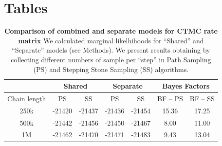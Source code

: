 \documentclass[10pt]{article}
\begin{document}
\section*{Tables}
\begin{table}[!ht]
\caption{{\bf Comparison of combined and separate models for CTMC rate matrix} We calculated marginal likelhihoods for ``Shared'' and ``Separate'' models (see Methods). We present results obtaining by collecting different numbers of sample per ``step'' in Path Sampling (PS) and Stepping Stone Sampling (SS) algorithms.}
 \begin{center}
 \begin{tabular}{ccccccc}
 \toprule
 &\multicolumn{2}{c}{Shared}& \multicolumn{2}{c}{Separate} & \multicolumn{2}{c}{Bayes Factors}\\
 \midrule
Chain length&PS&SS&PS&SS&BF -- PS&BF -- SS\\
250k&-21420&-21437&-21436&-21454&15.36&17.25\\
500k&-21442&-21456&-21450&-21467&8.00&11.00\\
1M&-21462&-21470&-21471&-21483&9.43&13.04\\
\bottomrule
 \end{tabular}
 \end{center}
 \begin{flushleft}
\end{flushleft}
\label{tab:sharedsep}
\end{table}
\end{document}
